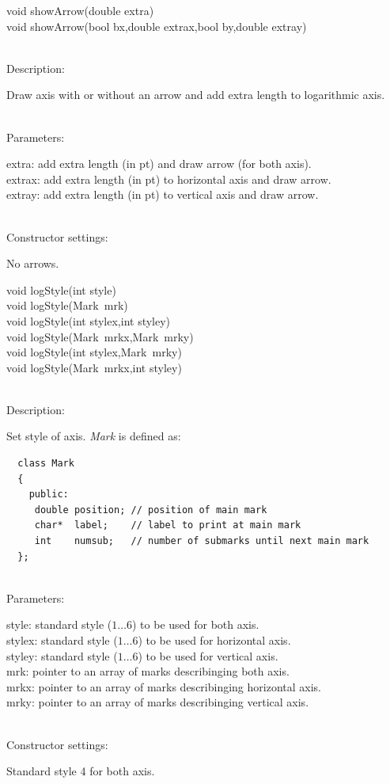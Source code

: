 \documentclass[12pt,a4paper]{article}
\newcommand{\memberitem}[1]{
                              \vspace{-0.5pc}
                              \end{minipage}\\
                              \phantom{M}#1:\\
                              \phantom{MM}
                              \begin{minipage}[t]{12cm}

                           }
\newcommand{\memdsc}{\memberitem{Description}}
\newcommand{\meminp}{\memberitem{Parameters}}
\newcommand{\memdef}{\memberitem{Constructor settings}}
\newenvironment{MemberDescr}
  {
    \begin{minipage}{15cm}
    \bf
  }
  {
    \end{minipage}
  }
\newcommand{\pntr}{\raisebox{-0.25em}{*}\ }
\begin{document}
  \begin{MemberDescr}
    void showArrow(double extra)\\
    void showArrow(bool bx,double extrax,bool by,double extray)\\
    \memdsc
      Draw axis with or without an arrow and add extra length to logarithmic
      axis.\\
    \meminp
      extra: add extra length (in pt) and draw arrow (for both axis).\\
      extrax: add extra length (in pt) to horizontal axis and draw arrow.\\
      extray: add extra length (in pt) to vertical axis and draw arrow.\\
    \memdef
      No arrows.\\
  \end{MemberDescr}

  \begin{MemberDescr}
    void logStyle(int style)\\
    void logStyle(Mark\pntr mrk)\\
    void logStyle(int stylex,int styley)\\
    void logStyle(Mark\pntr mrkx,Mark\pntr mrky)\\
    void logStyle(int stylex,Mark\pntr mrky)\\
    void logStyle(Mark\pntr mrkx,int styley)\\
    \memdsc
      Set style of axis. \textit{Mark} is defined as:\\
    \vspace{-1pc}
\begin{lstlisting}
  class Mark
  {
    public:
     double position; // position of main mark
     char*  label;    // label to print at main mark
     int    numsub;   // number of submarks until next main mark
  };

\end{lstlisting}

    \meminp
      style: standard style ($1\ldots6$) to be used for both axis.\\
      stylex: standard style ($1\ldots6$) to be used for horizontal axis.\\
      styley: standard style ($1\ldots6$) to be used for vertical axis.\\
      mrk:   pointer to an array of marks describinging both axis.\\
      mrkx:   pointer to an array of marks describinging horizontal axis.\\
      mrky:   pointer to an array of marks describinging vertical axis.\\
    \memdef
      Standard style 4 for both axis.\\
  \end{MemberDescr}
\end{document}
